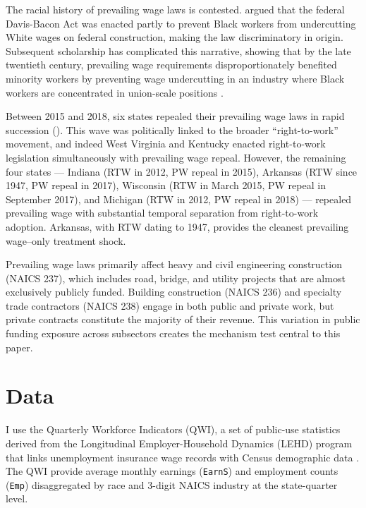 \documentclass[12pt]{article}
\begin{document}
The racial history of prevailing wage laws is contested. \citet{bernstein1993davisbacon} argued that the federal Davis-Bacon Act was enacted partly to prevent Black workers from undercutting White wages on federal construction, making the law discriminatory in origin. Subsequent scholarship has complicated this narrative, showing that by the late twentieth century, prevailing wage requirements disproportionately benefited minority workers by preventing wage undercutting in an industry where Black workers are concentrated in union-scale positions \citep{azarirad2005economics, duncan2019research}.

Between 2015 and 2018, six states repealed their prevailing wage laws in rapid succession (). This wave was politically linked to the broader ``right-to-work'' movement, and indeed West Virginia and Kentucky enacted right-to-work legislation simultaneously with prevailing wage repeal. However, the remaining four states --- Indiana (RTW in 2012, PW repeal in 2015), Arkansas (RTW since 1947, PW repeal in 2017), Wisconsin (RTW in March 2015, PW repeal in September 2017), and Michigan (RTW in 2012, PW repeal in 2018) --- repealed prevailing wage with substantial temporal separation from right-to-work adoption. Arkansas, with RTW dating to 1947, provides the cleanest prevailing wage--only treatment shock.

Prevailing wage laws primarily affect heavy and civil engineering construction (NAICS 237), which includes road, bridge, and utility projects that are almost exclusively publicly funded. Building construction (NAICS 236) and specialty trade contractors (NAICS 238) engage in both public and private work, but private contracts constitute the majority of their revenue. This variation in public funding exposure across subsectors creates the mechanism test central to this paper.


\section{Data}

I use the Quarterly Workforce Indicators (QWI), a set of public-use statistics derived from the Longitudinal Employer-Household Dynamics (LEHD) program that links unemployment insurance wage records with Census demographic data \citep{abowd2009lehd, abowd2011national}. The QWI provide average monthly earnings (\texttt{EarnS}) and employment counts (\texttt{Emp}) disaggregated by race and 3-digit NAICS industry at the state-quarter level.
\end{document}
